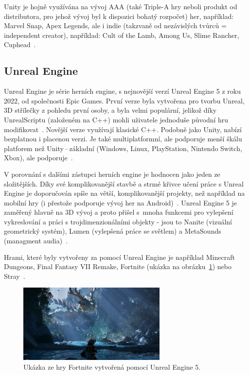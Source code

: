 Unity je hojně využívána na vývoj AAA (také Triple-A hry neboli produkt od distributora, pro jehož vývoj byl k dispozici bohatý rozpočet) her, například: Marvel Snap, Apex Legends, ale i indie (takzvaně od nezávislých tvůrců = independent creator), například: Cult of the Lamb, Among Us, Slime Rancher, Cuphead~\cite{unity_website}.

\subsection*{Unreal Engine}
Unreal Engine je série herních engine, s nejnovější verzí Unreal Engine 5 z roku 2022, od společnosti Epic Games. První verze byla vytvořena pro tvorbu Unreal, 3D střílečky z pohledu první osoby, a byla velmi populární, jelikož díky UnrealScriptu (založeném na C++) mohli uživatele jednoduše původní hru modifikovat~\cite{sanders2016introduction}. Novější verze využívají klasické C++. Podobně jako Unity, nabízí bezplatnou i placenou verzi. Je také multiplatformní, ale podporuje menší škálu platforem než Unity\,--\,základní (Windows, Linux, PlayStation, Nintendo Switch, Xbox), ale podporuje~\cite{unreal_engine}.

V porovnání s dalšími zástupci herních engine je hodnocen jako jeden ze složitějších. Díky své komplikovanější stavbě a strmé křivce učení práce s Unreal Engine je doporučován spíše na větší, komplikovanější projekty, než například na mobilní hry (i přestože podporuje vývoj her na Android)~\cite{Kevuru_Games_Unreal-Unity}. Unreal Engine 5 je zaměřený hlavně na 3D vývoj a proto přišel s~mnoha funkcemi pro vylepšení vykreslování a práci s trojdimenzionálními objekty - jsou to Nanite (vizuální geometrický systém), Lumen (vylepšená práce se světlem) a MetaSounds (managment audia)~\cite{UnrealEngine5}.

Hrami, které byly vytvořeny za pomocí Unreal Engine je například Minecraft Dungeons, Final Fantasy VII Remake, Fortnite (ukázka na obrázku~\ref{fig:fortnite-unreal_engine}) nebo Stray~\cite{unreal_engine}.

\begin{figure}[H]
	\centering
	\includegraphics[width=0.66\textwidth]{obrazky-figures/ch2/fortnite.png}
	\caption{Ukázka ze hry Fortnite vytvořená pomocí Unreal Engine 5.~\cite{unreal_engine}}
	\label{fig:fortnite-unreal_engine}
\end{figure}

